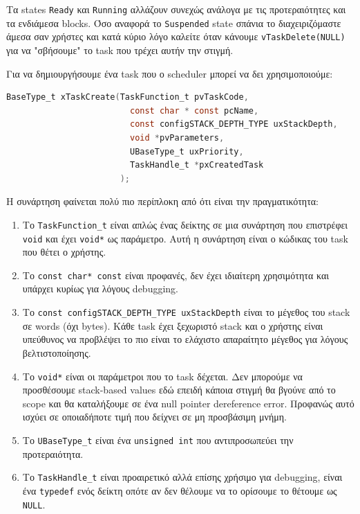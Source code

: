 Τα states \verb|Ready| και \verb|Running| αλλάζουν συνεχώς ανάλογα
με τις προτεραιότητες και τα ενδιάμεσα blocks. Όσο αναφορά το \verb|Suspended|
state σπάνια το διαχειριζόμαστε άμεσα σαν χρήστες και κατά κύριο λόγο καλείτε
όταν κάνουμε \verb|vTaskDelete(NULL)| για να "σβήσουμε" το task που τρέχει
αυτήν την στιγμή.

Για να δημιουργήσουμε ένα task που ο scheduler μπορεί να δει χρησιμοποιούμε:

\begin{lstlisting}[language=C]
BaseType_t xTaskCreate(TaskFunction_t pvTaskCode,
                         const char * const pcName,
                         const configSTACK_DEPTH_TYPE uxStackDepth,
                         void *pvParameters,
                         UBaseType_t uxPriority,
                         TaskHandle_t *pxCreatedTask
                       );
\end{lstlisting}

Η συνάρτηση φαίνεται πολύ πιο περίπλοκη από ότι είναι την πραγματικότητα:

\begin{enumerate}
\item Το \verb|TaskFunction_t| είναι απλώς ένας δείκτης σε μια συνάρτηση που
  επιστρέφει \verb|void| και έχει \verb|void*| ως παράμετρο. Αυτή η συνάρτηση είναι
  ο κώδικας του task που θέτει ο χρήστης.
\item Το \verb|const char* const| είναι προφανές, δεν έχει ιδιαίτερη χρησιμότητα και
  υπάρχει κυρίως για λόγους debugging.
\item Το \verb|const configSTACK_DEPTH_TYPE uxStackDepth| είναι το
μέγεθος του stack σε words (όχι bytes). Κάθε task έχει ξεχωριστό stack
και ο χρήστης είναι υπεύθυνος να προβλέψει το πιο είναι το ελάχιστο
απαραίτητο μέγεθος για λόγους βελτιστοποίησης.
\item Το \verb|void*| είναι οι παράμετροι που το task δέχεται. Δεν μπορούμε
  να προσθέσουμε stack-based values εδώ επειδή κάποια στιγμή θα βγούνε από το
  scope και θα καταλήξουμε σε ένα null pointer dereference error. Προφανώς
  αυτό ισχύει σε οποιαδήποτε τιμή που δείχνει σε μη προσβάσιμη μνήμη.
\item Το \verb|UBaseType_t| είναι ένα \verb|unsigned int| που αντιπροσωπεύει την προτεραιότητα.
\item Το \verb|TaskHandle_t| είναι προαιρετικό αλλά επίσης χρήσιμο για debugging,
  είναι ένα \verb|typedef| ενός δείκτη οπότε αν δεν θέλουμε να το ορίσουμε το θέτουμε
  ως \verb|NULL|.
\end{enumerate}
